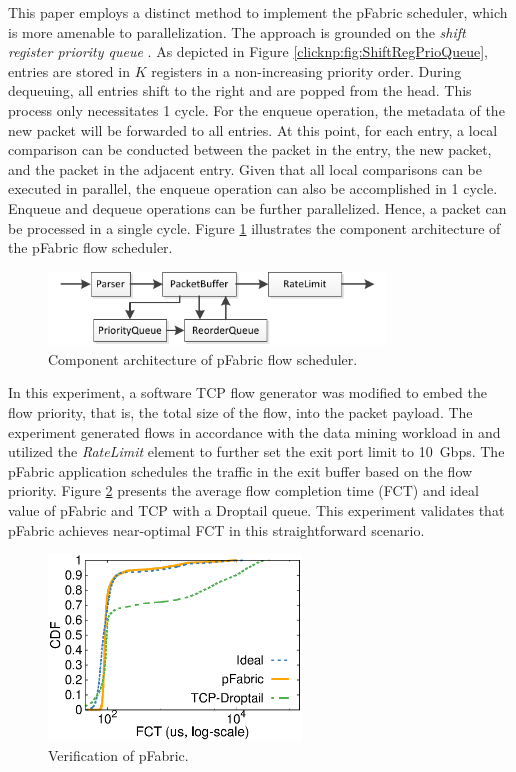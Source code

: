 This paper employs a distinct method to implement the pFabric scheduler, which is more amenable to parallelization.
The approach is grounded on the \textit{shift register priority queue} \cite {moon2000scalable}.
As depicted in Figure \ref{clicknp:fig:ShiftRegPrioQueue}, entries are stored in $K$ registers in a non-increasing priority order.
During dequeuing, all entries shift to the right and are popped from the head. This process only necessitates 1 cycle.
For the enqueue operation, the metadata of the new packet will be forwarded to all entries.
At this point, for each entry, a local comparison can be conducted between the packet in the entry, the new packet, and the packet in the adjacent entry.
Given that all local comparisons can be executed in parallel, the enqueue operation can also be accomplished in 1 cycle.
Enqueue and dequeue operations can be further parallelized.
Hence, a packet can be processed in a single cycle.
Figure \ref{clicknp:fig:pfabric-arch} illustrates the component architecture of the pFabric flow scheduler.

\begin{figure}[htbp]
	\centering
	\includegraphics[width=0.8\textwidth]{image/PFabric}
	\caption{Component architecture of pFabric flow scheduler.}
	\label{clicknp:fig:pfabric-arch}
\end{figure}

In this experiment, a software TCP flow generator\cite {mqecn} was modified to embed the flow priority, that is, the total size of the flow, into the packet payload. The experiment generated flows in accordance with the data mining workload in \cite {pfabric} and utilized the \textit {RateLimit} element to further set the exit port limit to 10~Gbps. The pFabric application schedules the traffic in the exit buffer based on the flow priority. Figure \ref{clicknp:fig:pfabric} presents the average flow completion time (FCT) and ideal value of pFabric and TCP with a Droptail queue. This experiment validates that pFabric achieves near-optimal FCT in this straightforward scenario.

\begin{figure}[htbp]
	\centering
	\includegraphics[width=0.6\textwidth]{eval/pfabric}
	\caption{Verification of pFabric.}
	\label{clicknp:fig:pfabric}
\end{figure}

